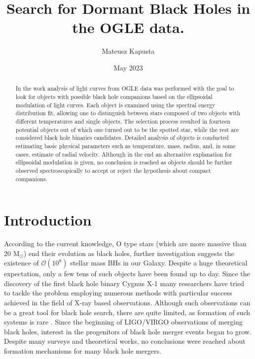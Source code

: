 \documentclass{pracalicmgr}
\author{Mateusz Kapusta}
\title{Search for Dormant Black Holes in the OGLE data.}
\date{May 2023}
\begin{document}
    \maketitle
    \let\cleardoublepage\clearpage
\begin{abstract}
    In the work analysis of light curves from OGLE data was performed with the goal to look for objects with possible black hole companions 
    based on the ellipsoidal modulation of light curves. Each object is examined using the spectral energy distribution fit, allowing one to distinguish
    between stars composed of two objects with different temperatures and single objects. The selection process resulted in fourteen
    potential objects out of which one turned out to be the spotted star, while the rest are considered black hole binaries candidates.
    Detailed analysis of objects is conducted estimating basic physical parameters such as temperature, mass, radius,
    and, in some cases, estimate of radial velocity. Although in the end an alternative explanation for ellipsoidal modulation is given, 
    no conclusion is reached as objects should be further observed spectroscopically to accept or reject the hypothesis about compact companions.
\end{abstract}

\tableofcontents

\chapter{Introduction}
According to the current knowledge, O type stars (which are more massive than $20$ M$_\odot$) end their evolution as black holes, further investigation suggests
the existence of $\mathcal{O}(10^8)$ stellar mass BHs \citep{brown_scenario_1994} in our Galaxy.
Despite a huge theoretical expectation, only a few tens of such objects have been found up to day.
Since the discovery of the first black hole binary Cygnus X-1 many researchers have tried to tackle the problem employing numerous methods with particular
success achieved in the field of X-ray based observations. Although such observations can be a great tool for black hole search, there are quite limited,
as formation of such systems is rare \citep{zwart_formation_1997}. Since the beginning of LIGO/VIRGO observations of merging black holes,
interest in the progenitors of black hole merger events began to grow. Despite many surveys and theoretical works, 
no conclusions were reached about formation mechanisms for many black hole mergers. 
\end{document}
